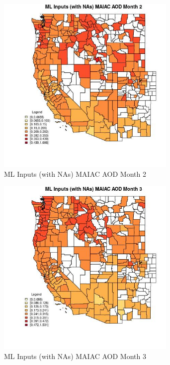 \begin{figure} 
\centering  
\includegraphics[width=0.77\textwidth]{Code_Outputs/Report_ML_input_PM25_Step4_part_f_de_duplicated_aveswNAs_CountyMAIAC_AODmedianMonth2.jpg} 
\caption{\label{fig:Report_ML_input_PM25_Step4_part_f_de_duplicated_aveswNAsCountyMAIAC_AODmedianMonth2}ML Inputs (with NAs) MAIAC AOD Month 2} 
\end{figure} 
 

\begin{figure} 
\centering  
\includegraphics[width=0.77\textwidth]{Code_Outputs/Report_ML_input_PM25_Step4_part_f_de_duplicated_aveswNAs_CountyMAIAC_AODmedianMonth3.jpg} 
\caption{\label{fig:Report_ML_input_PM25_Step4_part_f_de_duplicated_aveswNAsCountyMAIAC_AODmedianMonth3}ML Inputs (with NAs) MAIAC AOD Month 3} 
\end{figure} 
 

